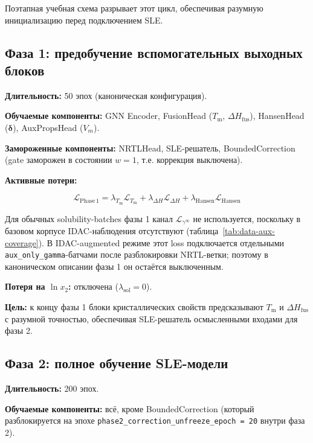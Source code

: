 \documentclass[11pt]{article}
\begin{document}
Поэтапная учебная схема разрывает этот цикл, обеспечивая разумную инициализацию перед подключением SLE.

\subsection{Фаза 1: предобучение вспомогательных выходных блоков}

\textbf{Длительность:} 50 эпох (каноническая конфигурация).

\textbf{Обучаемые компоненты:} GNN Encoder, FusionHead ($T_{\mathrm{m}}$, $\Delta H_{\mathrm{fus}}$), HansenHead ($\boldsymbol{\delta}$), AuxPropsHead ($V_m$).

\textbf{Замороженные компоненты:} NRTLHead, SLE-решатель, BoundedCorrection (gate заморожен в состоянии $w = 1$, т.е. коррекция выключена).

\textbf{Активные потери:}

\begin{equation*}
\mathcal{L}_{\mathrm{Phase\,1}} = \lambda_{T_{\mathrm{m}}}\mathcal{L}_{T_{\mathrm{m}}} + \lambda_{\Delta H}\mathcal{L}_{\Delta H} + \lambda_{\mathrm{Hansen}}\mathcal{L}_{\mathrm{Hansen}}
\end{equation*}

Для обычных solubility-batches фазы 1 канал $\mathcal{L}_{\gamma^\infty}$ не используется, поскольку в базовом корпусе IDAC-наблюдения отсутствуют (таблица~\ref{tab:data-aux-coverage}). В IDAC-augmented режиме этот loss подключается отдельными \texttt{aux\_only\_gamma}-батчами после разблокировки NRTL-ветки; поэтому в каноническом описании фазы 1 он остаётся выключенным.

\textbf{Потеря на $\ln x_2$:} отключена ($\lambda_{\mathrm{sol}} = 0$).

\textbf{Цель:} к концу фазы 1 блоки кристаллических свойств предсказывают $T_{\mathrm{m}}$ и $\Delta H_{\mathrm{fus}}$ с разумной точностью, обеспечивая SLE-решатель осмысленными входами для фазы 2.

\subsection{Фаза 2: полное обучение SLE-модели}
\label{subsec:phase2-full-training}

\textbf{Длительность:} 200 эпох.

\textbf{Обучаемые компоненты:} всё, кроме BoundedCorrection (который разблокируется на эпохе \texttt{phase2\_correction\_unfreeze\_epoch = 20} внутри фаза 2).
\end{document}
